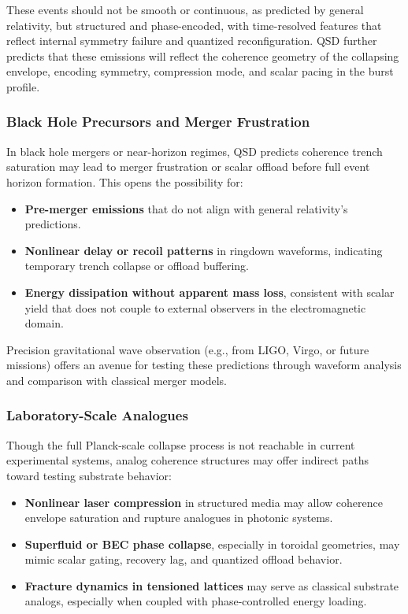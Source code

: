 \documentclass[entropy,article,submit,pdftex,moreauthors]{Definitions/mdpi}
\begin{document}
These events should not be smooth or continuous, as predicted by general relativity, but structured and phase-encoded, with time-resolved features that reflect internal symmetry failure and quantized reconfiguration. QSD further predicts that these emissions will reflect the coherence geometry of the collapsing envelope, encoding symmetry, compression mode, and scalar pacing in the burst profile.

\subsubsection{Black Hole Precursors and Merger Frustration}

In black hole mergers or near-horizon regimes, QSD predicts coherence trench saturation may lead to merger frustration or scalar offload before full event horizon formation. This opens the possibility for:
\begin{itemize}
  \item \textbf{Pre-merger emissions} that do not align with general relativity’s predictions.
  \item \textbf{Nonlinear delay or recoil patterns} in ringdown waveforms, indicating temporary trench collapse or offload buffering.
  \item \textbf{Energy dissipation without apparent mass loss}, consistent with scalar yield that does not couple to external observers in the electromagnetic domain.
\end{itemize}

Precision gravitational wave observation (e.g., from LIGO, Virgo, or future missions) offers an avenue for testing these predictions through waveform analysis and comparison with classical merger models.

\subsubsection{Laboratory-Scale Analogues}

Though the full Planck-scale collapse process is not reachable in current experimental systems, analog coherence structures may offer indirect paths toward testing substrate behavior:
\begin{itemize}
  \item \textbf{Nonlinear laser compression} in structured media may allow coherence envelope saturation and rupture analogues in photonic systems.
  \item \textbf{Superfluid or BEC phase collapse}, especially in toroidal geometries, may mimic scalar gating, recovery lag, and quantized offload behavior.
  \item \textbf{Fracture dynamics in tensioned lattices} may serve as classical substrate analogs, especially when coupled with phase-controlled energy loading.
\end{itemize}
\end{document}
